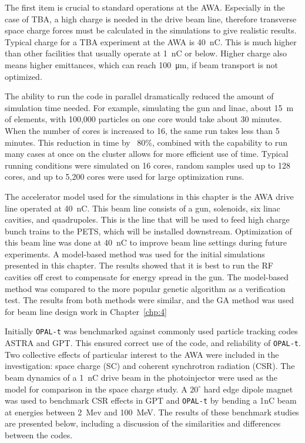 The first item is crucial to standard operations at the AWA. Especially in the 
case of TBA, a high charge is needed in the drive beam line, therefore transverse 
space charge forces must be calculated in the simulations to give realistic results.
Typical charge for a TBA experiment at the AWA is \SI{40}{nC}. 
This is much higher than other facilities that usually operate at \SI{1}{nC} or below. 
Higher charge also means higher emittances, which can reach \SI{100}{\micro\meter}, 
if beam transport is not optimized.

The ability to run the code in parallel dramatically reduced the amount of simulation time needed. 
For example, simulating the gun and linac, about \SI{15}{m} of elements,
with 100,000 particles on one core would take about 30 minutes. 
When the number of cores is increased to 16, the same run takes less than 
5 minutes. This reduction in time by ~80\%, combined with the capability to run 
many cases at once on the cluster allows for more efficient use of time.
Typical running conditions were simulated on 16 cores, random samples used up to 128 cores, 
and up to 5,200 cores were used for large optimization runs.

The accelerator model used for the simulations in this chapter is the AWA drive line operated at \SI{40}{nC}. 
This beam line consists of a gun, solenoids, six linac cavities, and quadrupoles.
This is the line that will be used to feed high charge bunch trains to the PETS, 
which will be installed downstream. Optimization of this beam line was done at \SI{40}{nC}
to improve beam line settings during future experiments.
A model-based method was used for the initial simulations presented in this chapter. The results showed that 
it is best to run the RF cavities off crest to compensate for energy spread in the gun. 
The model-based method was compared to the more popular genetic algorithm as a verification test.
The results from both methods were similar, and the GA method was used for beam line design work in Chapter~\ref{chp:4}

\label{sec:bench}

Initially \verb|OPAL-t| was benchmarked against commonly used particle tracking codes ASTRA and GPT.  
This ensured correct use of the code, and reliability of \verb|OPAL-t|.  
Two collective effects of particular interest to the AWA were included in the investigation: 
space charge (SC) and coherent synchrotron radiation (CSR).
The beam dynamics of a \SI{1}{nC} drive beam in the photoinjector were used as 
the model for comparison in the space charge study. 
A $20^{\circ}$ hard edge dipole magnet was used to benchmark CSR effects in GPT and \verb|OPAL-t| by bending a 1nC beam 
at energies between \SI{2}{Mev} and \SI{100}{MeV}.  
The results of these benchmark studies are presented below, 
including a discussion of the similarities and differences between the codes.
 
